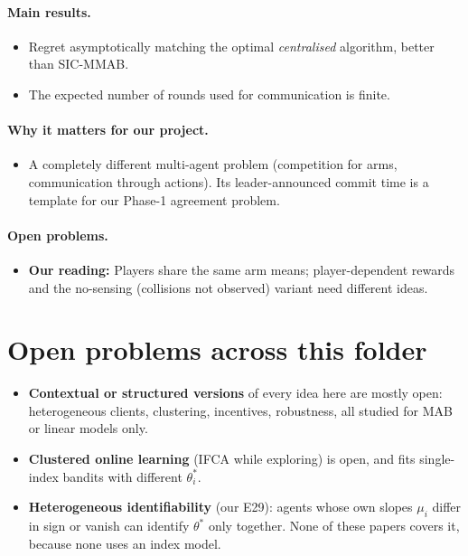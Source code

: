 \documentclass[11pt]{article}
\newcommand{\ours}{\textcolor{orange!80!black}{\textbf{Our reading:}}}
\begin{document}
\paragraph{Main results.}
\begin{itemize}\item Regret asymptotically matching the optimal \emph{centralised} algorithm, better than SIC-MMAB.\item The expected number of rounds used for communication is finite.\end{itemize}
\paragraph{Why it matters for our project.}
\begin{itemize}\item A completely different multi-agent problem (competition for arms, communication through actions). Its leader-announced commit time is a template for our Phase-1 agreement problem.\end{itemize}
\paragraph{Open problems.}
\begin{itemize}\item \ours{} Players share the same arm means; player-dependent rewards and the no-sensing (collisions not observed) variant need different ideas.\end{itemize}
\section{Open problems across this folder}
\begin{itemize}\item \textbf{Contextual or structured versions} of every idea here are mostly open: heterogeneous clients, clustering, incentives, robustness, all studied for MAB or linear models only.\item \textbf{Clustered online learning} (IFCA while exploring) is open, and fits single-index bandits with different $\theta^*_i$.\item \textbf{Heterogeneous identifiability} (our E29): agents whose own slopes $\mu_i$ differ in sign or vanish can identify $\theta^*$ only together. None of these papers covers it, because none uses an index model.\end{itemize}
\end{document}
